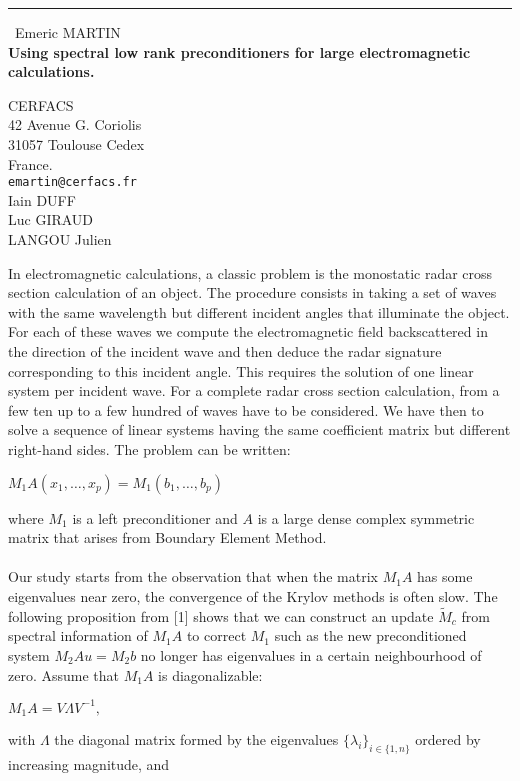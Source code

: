 \documentclass{report}
\begin{document}
\begin{center}
\rule{6in}{1pt} \
{\large Emeric MARTIN \\
{\bf Using spectral low rank preconditioners for large electromagnetic calculations.}}

CERFACS \\ 42 Avenue G. Coriolis \\ 31057 Toulouse Cedex \\ France.
\\
{\tt emartin@cerfacs.fr}\\
Iain DUFF\\
Luc GIRAUD\\
	LANGOU Julien\end{center}

In electromagnetic calculations, a classic problem is the monostatic
radar cross section calculation of an object.
The procedure consists in taking a set of waves with the same wavelength
but different incident angles that illuminate the object.
For each of these waves we compute the electromagnetic field
backscattered in the direction of the incident wave and then deduce
the radar signature corresponding to this incident angle.
This requires the solution of one linear system per incident wave.
For a complete radar cross section calculation, from a few ten up to a
few hundred of waves have to be considered.
We have then to solve a sequence of linear systems having the same
coefficient matrix but different right-hand sides.
The problem can be written:
\begin{center}
$M_{1} A (x_1, \ldots , x_p ) = M_{1} (b_1, \ldots , b_p ) $
\end{center}
where $M_{1}$ is a left preconditioner and $A$ is a large dense complex
symmetric matrix that arises from Boundary Element Method.\\
\\
Our study starts from the observation that when the matrix $M_{1}A$ has
some eigenvalues near zero, the convergence
of the Krylov methods is often slow. The following proposition from [1]
shows that we can construct an update ${\tilde{M}}_c$ from spectral
information of $M_1A$ to correct $M_1$ such as the new preconditioned
system $M_{2}Au = M_{2}b$ no longer has eigenvalues in a certain
neighbourhood of zero.
Assume that $M_1A$ is diagonalizable:
\begin{center}
$M_1A = V\Lambda V^{-1},$
\end{center}
with $\Lambda$ the diagonal matrix formed by the eigenvalues
${\{\lambda_i\}}_{i\in\{1,n\}}$ ordered by increasing magnitude, and
\end{document}
